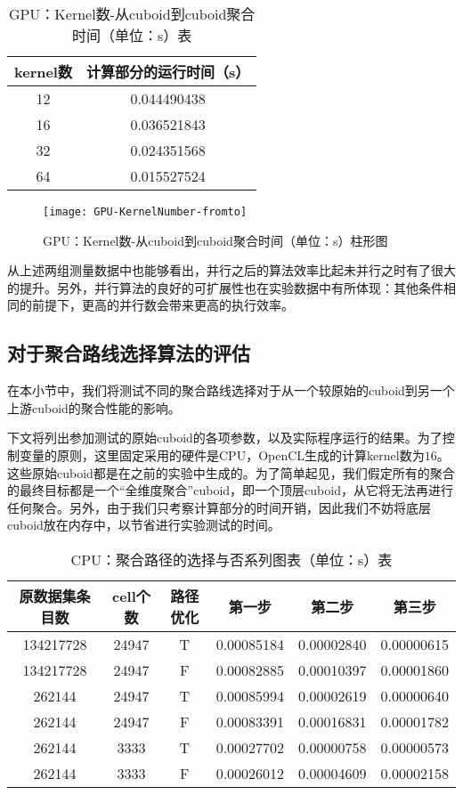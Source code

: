 \begin{table}[!htbp]
\centering
\caption{GPU：Kernel数-从cuboid到cuboid聚合时间（单位：s）表} 
\label{tab:table9}
\begin{tabular}{|c|c|}
    \hline
    kernel数 & 计算部分的运行时间（s）\\
    \hline
    12 & 0.044490438\\
    \hline
    16 & 0.036521843\\
    \hline
    32 & 0.024351568\\
    \hline
    64 & 0.015527524\\
    \hline
\end{tabular}
\end{table}

\begin{figure}[ht]
\centering
\texttt{[image: GPU-KernelNumber-fromto]}
\caption{GPU：Kernel数-从cuboid到cuboid聚合时间（单位：s）柱形图} 
\label{fig:figure5}
\end{figure}

从上述两组测量数据中也能够看出，并行之后的算法效率比起未并行之时有了很大的提升。另外，并行算法的良好的可扩展性也在实验数据中有所体现：其他条件相同的前提下，更高的并行数会带来更高的执行效率。

\subsection{对于聚合路线选择算法的评估}

在本小节中，我们将测试不同的聚合路线选择对于从一个较原始的cuboid到另一个上游cuboid的聚合性能的影响。

下文将列出参加测试的原始cuboid的各项参数，以及实际程序运行的结果。为了控制变量的原则，这里固定采用的硬件是CPU，OpenCL生成的计算kernel数为$16$。这些原始cuboid都是在之前的实验中生成的。为了简单起见，我们假定所有的聚合的最终目标都是一个“全维度聚合”cuboid，即一个顶层cuboid，从它将无法再进行任何聚合。另外，由于我们只考察计算部分的时间开销，因此我们不妨将底层cuboid放在内存中，以节省进行实验测试的时间。

\begin{table}[!htbp]
\centering
\caption{CPU：聚合路径的选择与否系列图表（单位：s）表} 
\label{tab:table10}
\begin{tabular}{|c|c|c|c|c|c|}
    \hline
    原数据集条目数 & cell个数 & 路径优化 & 第一步 & 第二步 & 第三步\\
    \hline
    134217728 & 24947 & T & 0.00085184 & 0.00002840 & 0.00000615\\
    \hline
    134217728 & 24947 & F & 0.00082885 & 0.00010397 & 0.00001860\\
    \hline
    262144 & 24947 & T & 0.00085994 & 0.00002619 & 0.00000640\\
    \hline
    262144 & 24947 & F & 0.00083391 & 0.00016831 & 0.00001782\\
    \hline
    262144 & 3333 & T & 0.00027702 & 0.00000758 & 0.00000573\\
    \hline
    262144 & 3333 & F & 0.00026012 & 0.00004609 & 0.00002158\\
    \hline
\end{tabular}
\end{table}


